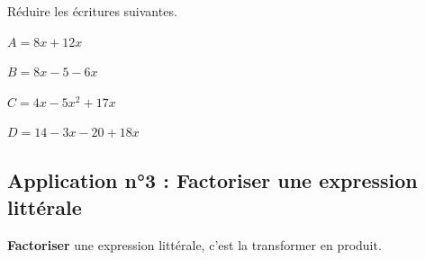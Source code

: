 \documentclass[a4paper]{book}
\begin{document}
    \begin{exemple}
        Réduire les écritures suivantes.

        \medskip
        
        \begin{minipage}{0.24\linewidth}
            $A=8x+12x$

            \vspace{2cm}
        \end{minipage}
        \hfill\vline\hfill
        \begin{minipage}{0.24\linewidth}
            $B=8x-5-6x$

            \vspace{2cm}
        \end{minipage}
        \hfill\vline\hfill
        \begin{minipage}{0.24\linewidth}
            $C=4x-5x^2+17x$

            \vspace{2cm}
        \end{minipage}
        \hfill\vline\hfill
        \begin{minipage}{0.24\linewidth}
            $D=14-3x-20+18x$

            \vspace{2cm}
        \end{minipage}
    \end{exemple}
    

\subsection{Application n°3 : Factoriser une expression littérale}
    \begin{definition}[Factoriser]
        \textbf{Factoriser} une expression littérale, c'est la transformer en produit.
    \end{definition}
\end{document}
